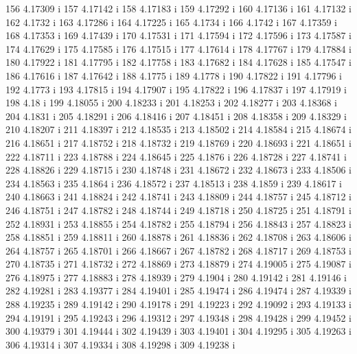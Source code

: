  156  4.17309  i
 157  4.17142  i
 158  4.17183  i
 159  4.17292  i
 160  4.17136  i
 161  4.17132  i
 162  4.1732  i
 163  4.17286  i
 164  4.17225  i
 165  4.1734  i
 166  4.1742  i
 167  4.17359  i
 168  4.17353  i
 169  4.17439  i
 170  4.17531  i
 171  4.17594  i
 172  4.17596  i
 173  4.17587  i
 174  4.17629  i
 175  4.17585  i
 176  4.17515  i
 177  4.17614  i
 178  4.17767  i
 179  4.17884  i
 180  4.17922  i
 181  4.17795  i
 182  4.17758  i
 183  4.17682  i
 184  4.17628  i
 185  4.17547  i
 186  4.17616  i
 187  4.17642  i
 188  4.1775  i
 189  4.1778  i
 190  4.17822  i
 191  4.17796  i
 192  4.1773  i
 193  4.17815  i
 194  4.17907  i
 195  4.17822  i
 196  4.17837  i
 197  4.17919  i
 198  4.18  i
 199  4.18055  i
 200  4.18233  i
 201  4.18253  i
 202  4.18277  i
 203  4.18368  i
 204  4.1831  i
 205  4.18291  i
 206  4.18416  i
 207  4.18451  i
 208  4.18358  i
 209  4.18329  i
 210  4.18207  i
 211  4.18397  i
 212  4.18535  i
 213  4.18502  i
 214  4.18584  i
 215  4.18674  i
 216  4.18651  i
 217  4.18752  i
 218  4.18732  i
 219  4.18769  i
 220  4.18693  i
 221  4.18651  i
 222  4.18711  i
 223  4.18788  i
 224  4.18645  i
 225  4.1876  i
 226  4.18728  i
 227  4.18741  i
 228  4.18826  i
 229  4.18715  i
 230  4.18748  i
 231  4.18672  i
 232  4.18673  i
 233  4.18506  i
 234  4.18563  i
 235  4.1864  i
 236  4.18572  i
 237  4.18513  i
 238  4.1859  i
 239  4.18617  i
 240  4.18663  i
 241  4.18824  i
 242  4.18741  i
 243  4.18809  i
 244  4.18757  i
 245  4.18712  i
 246  4.18751  i
 247  4.18782  i
 248  4.18744  i
 249  4.18718  i
 250  4.18725  i
 251  4.18791  i
 252  4.18931  i
 253  4.18855  i
 254  4.18782  i
 255  4.18794  i
 256  4.18843  i
 257  4.18823  i
 258  4.18851  i
 259  4.18811  i
 260  4.18878  i
 261  4.18836  i
 262  4.18708  i
 263  4.18606  i
 264  4.18757  i
 265  4.18701  i
 266  4.18667  i
 267  4.18782  i
 268  4.18717  i
 269  4.18753  i
 270  4.18735  i
 271  4.18732  i
 272  4.18869  i
 273  4.18879  i
 274  4.19005  i
 275  4.19087  i
 276  4.18975  i
 277  4.18883  i
 278  4.18939  i
 279  4.1904  i
 280  4.19142  i
 281  4.19146  i
 282  4.19281  i
 283  4.19377  i
 284  4.19401  i
 285  4.19474  i
 286  4.19474  i
 287  4.19339  i
 288  4.19235  i
 289  4.19142  i
 290  4.19178  i
 291  4.19223  i
 292  4.19092  i
 293  4.19133  i
 294  4.19191  i
 295  4.19243  i
 296  4.19312  i
 297  4.19348  i
 298  4.19428  i
 299  4.19452  i
 300  4.19379  i
 301  4.19444  i
 302  4.19439  i
 303  4.19401  i
 304  4.19295  i
 305  4.19263  i
 306  4.19314  i
 307  4.19334  i
 308  4.19298  i
 309  4.19238  i

